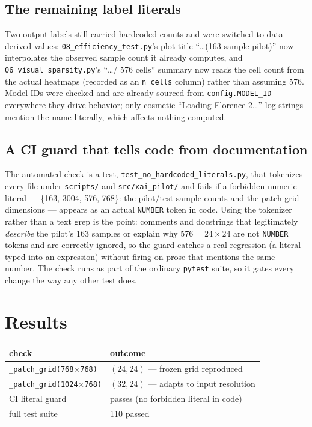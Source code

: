 \subsection{The remaining label literals}

Two output labels still carried hardcoded counts and were switched to data-derived values:
\texttt{08\_efficiency\_test.py}'s plot title ``\ldots(163-sample pilot)'' now interpolates the
observed sample count it already computes, and \texttt{06\_visual\_sparsity.py}'s
``\ldots/ 576 cells'' summary now reads the cell count from the actual heatmaps (recorded as an
\texttt{n\_cells} column) rather than assuming 576. Model IDs were checked and are already sourced from
\texttt{config.MODEL\_ID} everywhere they drive behavior; only cosmetic ``Loading Florence-2\ldots'' log
strings mention the name literally, which affects nothing computed.

\subsection{A CI guard that tells code from documentation}

The automated check is a test, \texttt{test\_no\_hardcoded\_literals.py}, that tokenizes every file
under \texttt{scripts/} and \texttt{src/xai\_pilot/} and fails if a forbidden numeric literal ---
\{163, 3004, 576, 768\}: the pilot/test sample counts and the patch-grid dimensions --- appears as an
actual \texttt{NUMBER} token in code. Using the tokenizer rather than a text grep is the point: comments
and docstrings that legitimately \emph{describe} the pilot's 163 samples or explain why $576 = 24\times
24$ are not \texttt{NUMBER} tokens and are correctly ignored, so the guard catches a real regression (a
literal typed into an expression) without firing on prose that mentions the same number. The check runs
as part of the ordinary \texttt{pytest} suite, so it gates every change the way any other test does.

\section{Results}

\begin{center}
\begin{tabular}{p{5.4cm}p{7.2cm}}
\toprule
\textbf{check} & \textbf{outcome} \\
\midrule
\texttt{\_patch\_grid(768$\times$768)}   & $(24,24)$ --- frozen grid reproduced \\
\texttt{\_patch\_grid(1024$\times$768)}  & $(32,24)$ --- adapts to input resolution \\
CI literal guard                         & passes (no forbidden literal in code) \\
full test suite                          & 110 passed \\
\bottomrule
\end{tabular}
\label{tab:p17}
\end{center}

